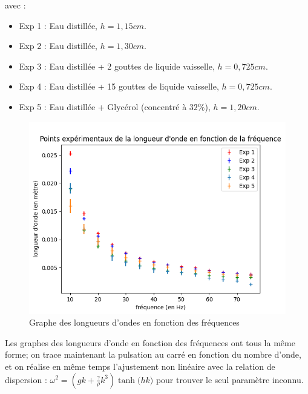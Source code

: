 \documentclass{report}
\begin{document}
 avec :
\begin{itemize}
     \item \scriptsize{Exp 1 : Eau distillée, $h = 1,15 cm$.}
     \item \scriptsize{Exp 2 : Eau distillée, $h = 1,30 cm$.}
     \item \scriptsize{Exp 3 : Eau distillée + 2 gouttes de liquide vaisselle, $h = 0,725 cm$.}
     \item \scriptsize{Exp 4 : Eau distillée + 15 gouttes de liquide vaisselle, $h = 0,725 cm$.}
     \item \scriptsize{Exp 5 : Eau distillée + Glycérol (concentré à $32\%$), $h = 1,20 cm$.}
 \end{itemize}


\begin{figure}[H]
    \centering
    \includegraphics[scale=0.735]{graphe1.png}
    \caption{Graphe des longueurs d'ondes en fonction des fréquences}
    \label{fig:enter-label}
\end{figure}

Les graphes des longueurs d'onde en fonction des fréquences ont tous la même forme; on trace maintenant la pulsation au carré en fonction du nombre d'onde, et on réalise en même temps l'ajustement non linéaire avec la relation de dispersion : $\omega^2=(gk+\frac{\gamma}{\rho}k^3) \tanh{(hk})$ pour trouver le seul paramètre inconnu.\\
\end{document}
